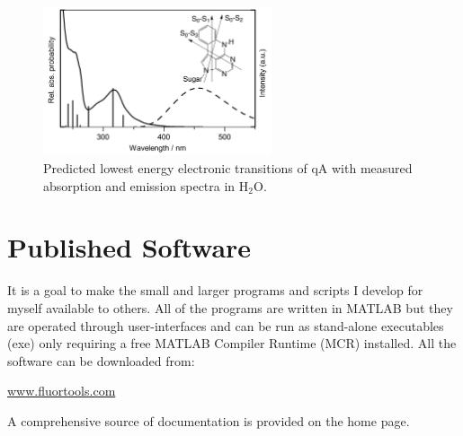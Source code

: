 \begin{figure}
    \centering
        \includegraphics[width=0.6\textwidth]{adds//cej_fig.png}
    \captionsetup{width=.95\textwidth}
    \caption{Predicted lowest energy electronic transitions of qA with measured absorption and emission spectra in H$_2$O.}
    \label{Fig:chap_Papers_CEJ}
\end{figure}


\section{Published Software}
 It is a goal to make the small and larger programs and scripts I develop for myself available to others. All of the programs are written in MATLAB but they are operated through user-interfaces and can be run as stand-alone executables (exe) only requiring a free MATLAB Compiler Runtime (MCR) installed. All the software can be downloaded from:

 \url{www.fluortools.com}

 A comprehensive source of documentation is provided on the home page.

\label{sec_PublishedSoftware}
